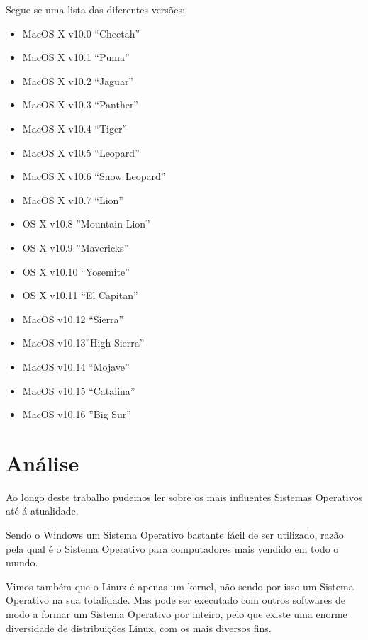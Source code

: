 \documentclass{report}
\begin{document}
Segue-se uma lista das diferentes versões:

\begin{itemize}
    \item MacOS X v10.0 “Cheetah”
    \item MacOS X v10.1 “Puma”
    \item MacOS X v10.2 “Jaguar”
    \item MacOS X v10.3 “Panther”
    \item MacOS X v10.4 “Tiger”
    \item MacOS X v10.5 “Leopard”
    \item MacOS X v10.6 “Snow Leopard”
    \item MacOS X v10.7 “Lion”
    \item OS X v10.8  ”Mountain Lion”
    \item OS X v10.9 ”Mavericks”
    \item OS X v10.10 “Yosemite”
    \item OS X v10.11 “El Capitan”
    \item MacOS  v10.12 “Sierra”
    \item MacOS v10.13”High Sierra”
    \item MacOS v10.14 “Mojave”
    \item MacOS v10.15 “Catalina”
    \item MacOS v10.16 ”Big Sur”
\end{itemize}


\chapter{Análise}
\label{chap.analise}
Ao longo deste trabalho pudemos ler sobre os mais influentes Sistemas Operativos até á atualidade. 

\vspace{5mm}

Sendo o Windows um Sistema Operativo bastante fácil de ser utilizado, razão pela qual é o Sistema Operativo para computadores mais vendido em todo o mundo. 
\vspace{5mm}

Vimos também que o Linux é apenas um kernel, não sendo por isso um Sistema Operativo na sua totalidade. Mas pode ser executado com outros softwares de modo a formar um Sistema Operativo por inteiro, pelo que existe uma enorme diversidade de distribuições Linux, com os mais diversos fins.

\vspace{5mm}
\end{document}
